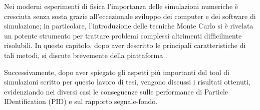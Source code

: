 






Nei moderni esperimenti di fisica l'importanza delle simulazioni numeriche è cresciuta senza sosta grazie all'eccezionale sviluppo dei computer e dei software di simulazione; in particolare, l'introduzione delle tecniche Monte Carlo si è rivelata un potente strumento per trattare problemi complessi altrimenti difficilmente risolubili.
In questo capitolo, dopo aver descritto le principali caratteristiche di tali metodi, si discute brevemente della piattaforma \geant.

Successivamente, dopo aver spiegato gli aspetti più importanti del tool di simulazioni scritto per questo lavoro di tesi, vengono discussi i risultati ottenuti, evidenziando nei diversi casi le conseguenze sulle performance di Particle IDentification (PID) e sul rapporto segnale-fondo.





\section{}



